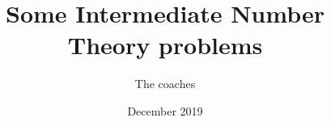 \documentclass[a4paper,12pt]{article}
\begin{document}
\title {Some Intermediate Number Theory problems}
\author{The coaches}
\date{December 2019}
\maketitle


\begin{itemize}

\end{itemize}
\end{document}

